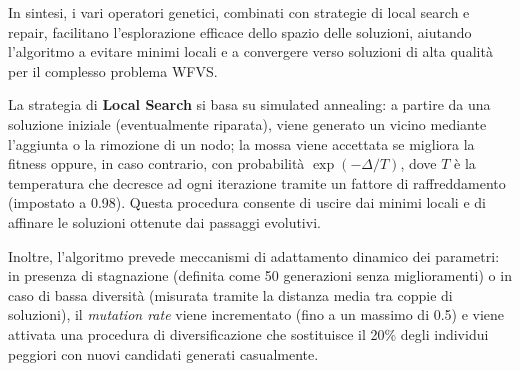 \documentclass[12pt,a4paper,twoside]{article}
\begin{document}
\begin{itemize}
\end{itemize}

\noindent In sintesi, i vari operatori genetici, combinati con strategie di local search e repair, facilitano l'esplorazione efficace dello spazio delle soluzioni, aiutando l'algoritmo a evitare minimi locali e a convergere verso soluzioni di alta qualità per il complesso problema WFVS.

\noindent La strategia di \textbf{Local Search} si basa su simulated annealing: a partire da una soluzione iniziale (eventualmente riparata), viene generato un vicino mediante l'aggiunta o la rimozione di un nodo; la mossa viene accettata se migliora la fitness oppure, in caso contrario, con probabilità \(\exp(-\Delta/T)\), dove \(T\) è la temperatura che decresce ad ogni iterazione tramite un fattore di raffreddamento (impostato a 0.98). Questa procedura consente di uscire dai minimi locali e di affinare le soluzioni ottenute dai passaggi evolutivi.

\noindent Inoltre, l'algoritmo prevede meccanismi di adattamento dinamico dei parametri: in presenza di stagnazione (definita come 50 generazioni senza miglioramenti) o in caso di bassa diversità (misurata tramite la distanza media tra coppie di soluzioni), il \emph{mutation rate} viene incrementato (fino a un massimo di 0.5) e viene attivata una procedura di diversificazione che sostituisce il 20\% degli individui peggiori con nuovi candidati generati casualmente.
\end{document}
